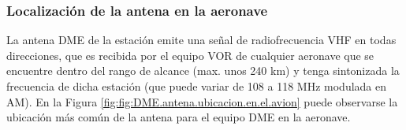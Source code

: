 \subsubsection{Localizaci\'on de la antena en la aeronave}
\label{sec:DME.localizacion.antena.aeronave}

La antena DME de la estaci\'on emite una se\~nal de radiofrecuencia VHF en todas direcciones, que es recibida por el equipo VOR de cualquier aeronave que se encuentre dentro del rango de alcance (max. unos 240 km) y tenga sintonizada la frecuencia de dicha estaci\'on (que puede variar de 108 a 118 MHz modulada en AM). En la Figura \ref{fig:fig:DME.antena.ubicacion.en.el.avion} puede observarse la ubicaci\'on m\'as com\'un de la antena para el equipo DME en la aeronave.

\begin{figure}[!htb]
\hspace{3mm}
\end{figure}



